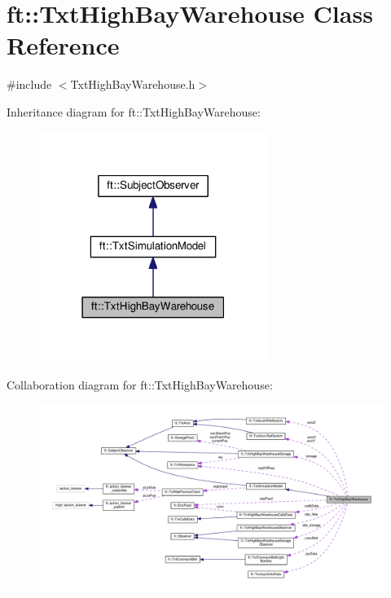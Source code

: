 \hypertarget{classft_1_1_txt_high_bay_warehouse}{}\section{ft\+:\+:Txt\+High\+Bay\+Warehouse Class Reference}
\label{classft_1_1_txt_high_bay_warehouse}


{\ttfamily \#include $<$Txt\+High\+Bay\+Warehouse.\+h$>$}



Inheritance diagram for ft\+:\+:Txt\+High\+Bay\+Warehouse\+:
\nopagebreak
\begin{figure}[H]
\begin{center}
\leavevmode
\includegraphics[width=210pt]{classft_1_1_txt_high_bay_warehouse__inherit__graph}
\end{center}
\end{figure}


Collaboration diagram for ft\+:\+:Txt\+High\+Bay\+Warehouse\+:
\nopagebreak
\begin{figure}[H]
\begin{center}
\leavevmode
\includegraphics[width=350pt]{classft_1_1_txt_high_bay_warehouse__coll__graph}
\end{center}
\end{figure}
